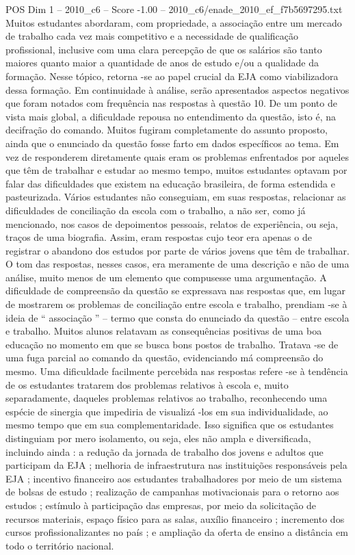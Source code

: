 \begin{textsample}{POS Dim 1 – 2010\_c6 – Score -1.00 – 2010\_c6/enade\_2010\_ef\_f7b5697295.txt}
Muitos estudantes abordaram, com propriedade, a associação entre um mercado de trabalho cada vez mais competitivo e a necessidade de qualificação profissional, inclusive com uma clara percepção de que os salários são tanto maiores quanto maior a quantidade de anos de estudo e/ou a qualidade da formação.
Nesse tópico, retorna -se ao papel crucial da EJA como viabilizadora dessa formação.
Em continuidade à análise, serão apresentados aspectos negativos que foram notados com frequência nas respostas à questão 10.
De um ponto de vista mais global, a dificuldade repousa no entendimento da questão, isto é, na decifração do comando.
Muitos fugiram completamente do assunto proposto, ainda que o enunciado da questão fosse farto em dados específicos ao tema.
Em vez de responderem diretamente quais eram os problemas enfrentados por aqueles que têm de trabalhar e estudar ao mesmo tempo, muitos estudantes optavam por falar das dificuldades que existem na educação brasileira, de forma estendida e pasteurizada.
Vários estudantes não conseguiam, em suas respostas, relacionar as dificuldades de conciliação da escola com o trabalho, a não ser, como já mencionado, nos casos de depoimentos pessoais, relatos de experiência, ou seja, traços de uma biografia.
Assim, eram respostas cujo teor era apenas o de registrar o abandono dos estudos por parte de vários jovens que têm de trabalhar.
O tom das respostas, nesses casos, era meramente de uma descrição e não de uma análise, muito menos de um elemento que compusesse uma argumentação.
A dificuldade de compreensão da questão se expressava nas respostas que, em lugar de mostrarem os problemas de conciliação entre escola e trabalho, prendiam -se à ideia de “ associação ” – termo que consta do enunciado da questão – entre escola e trabalho.
Muitos alunos relatavam as consequências positivas de uma boa educação no momento em que se busca bons postos de trabalho.
Tratava -se de uma fuga parcial ao comando da questão, evidenciando má compreensão do mesmo.
Uma dificuldade facilmente percebida nas respostas refere -se à tendência de os estudantes tratarem dos problemas relativos à escola e, muito separadamente, daqueles problemas relativos ao trabalho, reconhecendo uma espécie de sinergia que impediria de visualizá -los em sua individualidade, ao mesmo tempo que em sua complementaridade.
Isso significa que os estudantes distinguiam por mero isolamento, ou seja, eles não ampla e diversificada, incluindo ainda : a redução da jornada de trabalho dos jovens e adultos que participam da EJA ; melhoria de infraestrutura nas instituições responsáveis pela EJA ; incentivo financeiro aos estudantes trabalhadores por meio de um sistema de bolsas de estudo ; realização de campanhas motivacionais para o retorno aos estudos ; estímulo à participação das empresas, por meio da solicitação de recursos materiais, espaço físico para as salas, auxílio financeiro ; incremento dos cursos profissionalizantes no país ; e ampliação da oferta de ensino a distância em todo o território nacional.

\end{textsample}
